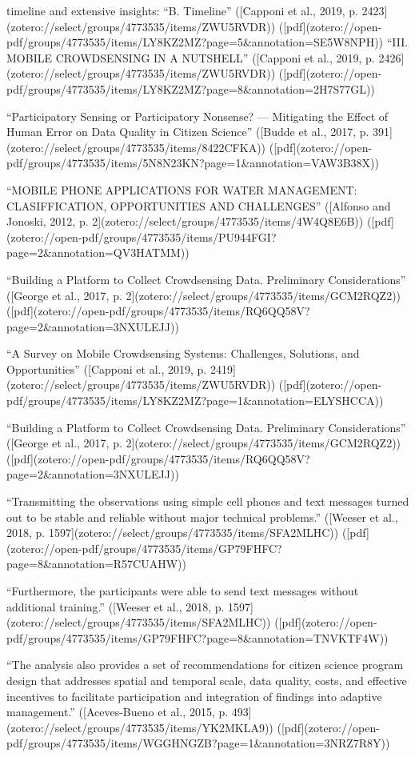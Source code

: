 {timeline and extensive insights:
“B. Timeline” ([Capponi et al., 2019, p. 2423](zotero://select/groups/4773535/items/ZWU5RVDR)) ([pdf](zotero://open-pdf/groups/4773535/items/LY8KZ2MZ?page=5&annotation=SE5W8NPH))
“III. MOBILE CROWDSENSING IN A NUTSHELL” ([Capponi et al., 2019, p. 2426](zotero://select/groups/4773535/items/ZWU5RVDR)) ([pdf](zotero://open-pdf/groups/4773535/items/LY8KZ2MZ?page=8&annotation=2H7S77GL))

“Participatory Sensing or Participatory Nonsense? — Mitigating the Effect of Human Error on Data Quality in Citizen Science” ([Budde et al., 2017, p. 391](zotero://select/groups/4773535/items/8422CFKA)) ([pdf](zotero://open-pdf/groups/4773535/items/5N8N23KN?page=1&annotation=VAW3B38X))

“MOBILE PHONE APPLICATIONS FOR WATER MANAGEMENT: CLASIFFICATION, OPPORTUNITIES AND CHALLENGES” ([Alfonso and Jonoski, 2012, p. 2](zotero://select/groups/4773535/items/4W4Q8E6B)) ([pdf](zotero://open-pdf/groups/4773535/items/PU944FGI?page=2&annotation=QV3HATMM))

“Building a Platform to Collect Crowdsensing Data. Preliminary Considerations” ([George et al., 2017, p. 2](zotero://select/groups/4773535/items/GCM2RQZ2)) ([pdf](zotero://open-pdf/groups/4773535/items/RQ6QQ58V?page=2&annotation=3NXULEJJ))

“A Survey on Mobile Crowdsensing Systems: Challenges, Solutions, and Opportunities” ([Capponi et al., 2019, p. 2419](zotero://select/groups/4773535/items/ZWU5RVDR)) ([pdf](zotero://open-pdf/groups/4773535/items/LY8KZ2MZ?page=1&annotation=ELYSHCCA))

“Building a Platform to Collect Crowdsensing Data. Preliminary Considerations” ([George et al., 2017, p. 2](zotero://select/groups/4773535/items/GCM2RQZ2)) ([pdf](zotero://open-pdf/groups/4773535/items/RQ6QQ58V?page=2&annotation=3NXULEJJ))

“Transmitting the observations using simple cell phones and text messages turned out to be stable and reliable without major technical problems.” ([Weeser et al., 2018, p. 1597](zotero://select/groups/4773535/items/SFA2MLHC)) ([pdf](zotero://open-pdf/groups/4773535/items/GP79FHFC?page=8&annotation=R57CUAHW))

“Furthermore, the participants were able to send text messages without additional training.” ([Weeser et al., 2018, p. 1597](zotero://select/groups/4773535/items/SFA2MLHC)) ([pdf](zotero://open-pdf/groups/4773535/items/GP79FHFC?page=8&annotation=TNVKTF4W))

“The analysis also provides a set of recommendations for citizen science program design that addresses spatial and temporal scale, data quality, costs, and effective incentives to facilitate participation and integration of findings into adaptive management.” ([Aceves-Bueno et al., 2015, p. 493](zotero://select/groups/4773535/items/YK2MKLA9)) ([pdf](zotero://open-pdf/groups/4773535/items/WGGHNGZB?page=1&annotation=3NRZ7R8Y))

}
